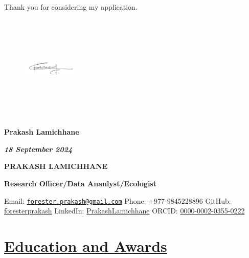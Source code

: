 \documentclass[
]{article}
\begin{document}
Thank you for considering my application.

\vspace{1cm}

\begin{figure}[h]
    \includegraphics[width=1in, height=2in]{sign.png}
\end{figure}

\textbf{Prakash Lamichhane}

\textbf{\emph{18 September 2024}}

\newpage 
\Huge

\bf{PRAKASH LAMICHHANE}

\par

\normalsize
\mdseries

\bf{Research Officer/Data Ananlyst/Ecologist}

\par

\normalsize
\mdseries

Email:
\href{mailto:forester.prakash@gmail.com}{\nolinkurl{forester.prakash@gmail.com}}
\textbar{} Phone: +977-9845228896 \textbar{} GitHub:
\href{https://github.com/foresterprakash}{foresterprakash} \textbar{}
LinkedIn:
\href{https://www.linkedin.com/in/PrakashLamichhane}{PrakashLamichhane}
\textbar{} ORCID:
\href{https://orcid.org/0000-0002-0355-0222}{0000-0002-0355-0222}
\textbar{}

\section{\texorpdfstring{\underline{Education and Awards}}{}}\label{section}
\end{document}

